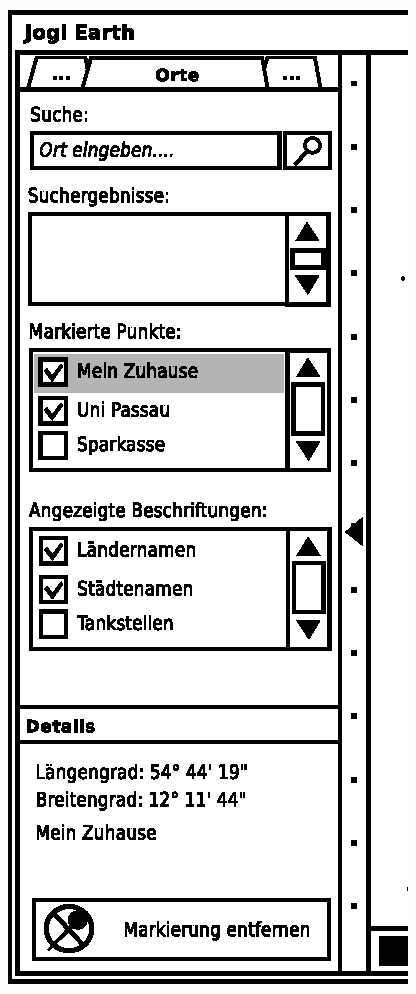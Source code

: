 \begin{figure}
	\centering
	\begin{minipage}[c]{5cm}
		\includegraphics[scale=0.9]{GUI-Orte.eps}
	\end{minipage}
	\begin{minipage}[c]{5cm}

\end{minipage}
\end{figure}
